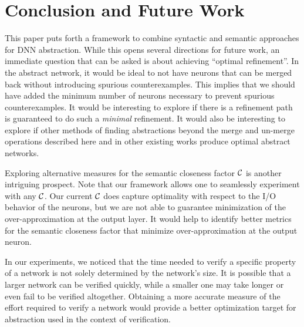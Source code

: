 \section{Conclusion and Future Work}

This paper puts forth a framework to combine syntactic and semantic approaches
for DNN abstraction. While this opens several directions for future work, an
immediate question that can be asked is about achieving ``optimal refinement''.
In the abstract network, it would be ideal to not have neurons that can be
merged back without introducing spurious counterexamples. This implies that we
should have added the minimum number of neurons necessary to prevent spurious
counterexamples. 
It would  be interesting to explore if there is a refinement path 
is guaranteed to do such a \emph{minimal} refinement. 
It would also be interesting to explore if other methods of finding abstractions
beyond the merge and un-merge operations described here and in other existing
works \cite{cegar-nn,cegarette,cleverest-nn,deep-abstract} produce optimal abstract networks.

Exploring alternative measures for the semantic closeness factor $\mathcal{C}$ is
another intriguing prospect. Note that our framework allows one to seamlessly
experiment with any $\mathcal{C}$. Our current $\mathcal{C}$ does capture optimality with
respect to the I/O behavior of the neurons, but we are not able to guarantee
minimization of the over-approximation at the output layer. It would help to
identify better metrics for the semantic closeness factor that minimize
over-approximation at the output neuron. 

In our experiments, we noticed that the time needed to verify a specific
property of a network is not solely determined by the network's size. It is
possible that a larger network can be verified quickly, while a smaller one may
take longer or even fail to be verified altogether. Obtaining a more accurate
measure of the effort required to verify a network would provide a better
optimization target for abstraction used in the context of verification.



